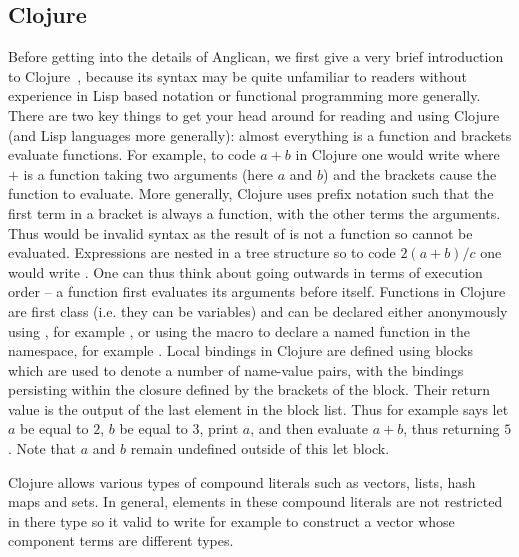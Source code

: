 \subsection{Clojure}
\label{sec:probprog:anglican:clojure} 

Before getting into the details of Anglican, we first give a very brief introduction to Clojure~\citep{hickey2008clojure},
because its syntax may be quite unfamiliar to readers without experience in Lisp based notation or functional programming
more generally.  There are two key things to get your head around for reading and using Clojure (and Lisp languages more
generally): almost everything is a function and brackets evaluate functions.  For example, to code $a+b$ in Clojure one
would write {\small {}} where $+$ is a function taking two arguments (here $a$ and $b$) and the brackets cause the
function to evaluate.  More generally, Clojure uses prefix notation such that 
the first term in a bracket is always a function, with the other terms the arguments.
Thus {\small {}} would be invalid syntax as the result of {\small {}}  is not a function so cannot be evaluated.
Expressions are nested in a tree structure so to code $2(a+b)/c$ one would write {\small {}}.  One can
thus think about going outwards in terms of execution order -- a function first evaluates its arguments before
itself.  Functions in Clojure are first class (i.e. they can be variables) and can be declared either anonymously using
{\small {}}, for example {\small {}}, or using the
macro  to declare a named function in the namespace, for example {\small {}}.
Local bindings in Clojure are defined using \cllet blocks which are used to denote a number of name-value
pairs, with the bindings persisting within the closure defined by the brackets of the \cllet block. Their return value
is the output of the last element in the \cllet block list.  Thus for example
{\small {}} says let $a$ be equal to $2$, $b$ be equal to $3$, print $a$,
and then evaluate $a+b$, thus returning $5$.  Note that $a$ and $b$ remain undefined outside of this let block.  

Clojure allows various types of compound literals such as vectors, lists, hash maps and sets.
In general, elements in these compound literals are not restricted in
there type so it valid to write for example {\small \lsi{[1 "2" (fn [x] (inc x))]}} to construct a vector 
whose component terms are different types.

